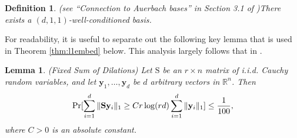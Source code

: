 \documentclass[11pt]{article}
\newtheorem{lemma}[theorem]{Lemma}
\newtheorem{definition}[theorem]{Definition}
\newcommand{\mat}[1]{{\ensuremath{\bm{\mathrm{#1}}}}}
\def\matS{\mat{S}}
\def\frac#1#2{{#1\over #2}}
\def\y{{\mathbf y}}
\begin{document}
\begin{definition}(see ``Connection to Auerbach bases'' in Section 3.1 of \cite{DDHKM09})\label{thm:auerbach}
There exists a $(d, 1, 1)$-well-conditioned basis. 
\end{definition}

For readability, it is useful to separate out the following key lemma that is used in Theorem \ref{thm:l1embed} below.
This analysis largely follows that in \cite{sw11}. 
\begin{lemma}\label{lem:key}(Fixed Sum of Dilations)
Let $\matS$ be an $r \times n$ matrix of i.i.d. Cauchy random variables, and let $\y_1, \ldots, \y_d$ be $d$ arbitrary vectors
in $\mathbb{R}^n$. Then 
$$\Pr[\sum_{i=1}^d \|\matS \y_i\|_1 \geq C r \log(rd) \sum_{i=1}^d \|\y_i\|_1] \leq \frac{1}{100},$$
where $C > 0$ is an absolute constant. 
\end{lemma}
\end{document}

